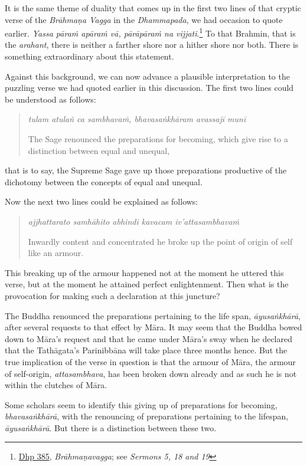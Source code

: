 It is the same theme of duality that comes up in the first two lines of that cryptic verse of the \emph{Brāhmaṇa Vagga} in the \emph{Dhammapada}, we had occasion to quote earlier. \emph{Yassa pāraṁ apāraṁ vā, pārāpāraṁ na vijjati}.\footnote{\href{https://suttacentral.net/dhp383-423/pli/ms}{Dhp 385}, \emph{Brāhmaṇavagga}; see \emph{Sermons 5, 18 and 19}} To that Brahmin, that is the \emph{arahant}, there is neither a farther shore nor a hither shore nor both. There is something extraordinary about this statement.

Against this background, we can now advance a plausible interpretation to the puzzling verse we had quoted earlier in this discussion. The first two lines could be understood as follows:

\begin{quote}
\emph{tulam atulañ ca sambhavaṁ, bhavasaṅkhāram avassajī munī}

The Sage renounced the preparations for becoming, which give rise to a distinction between equal and unequal,
\end{quote}

that is to say, the Supreme Sage gave up those preparations productive of the dichotomy between the concepts of equal and unequal.

Now the next two lines could be explained as follows:

\begin{quote}
\emph{ajjhattarato samhāhito abhindi kavacam iv'attasambhavaṁ}

Inwardly content and concentrated he broke up the point of origin of self like an armour.
\end{quote}

This breaking up of the armour happened not at the moment he uttered this verse, but at the moment he attained perfect enlightenment. Then what is the provocation for making such a declaration at this juncture?

The Buddha renounced the preparations pertaining to the life span, \emph{āyusaṅkhārā}, after several requests to that effect by Māra. It may seem that the Buddha bowed down to Māra's request and that he came under Māra's sway when he declared that the Tathāgata's Parinibbāna will take place three months hence. But the true implication of the verse in question is that the armour of Māra, the armour of self-origin, \emph{attasambhava}, has been broken down already and as such he is not within the clutches of Māra.

Some scholars seem to identify this giving up of preparations for becoming, \emph{bhavasaṅkhārā}, with the renouncing of preparations pertaining to the lifespan, \emph{āyusaṅkhārā}. But there is a distinction between these two.

